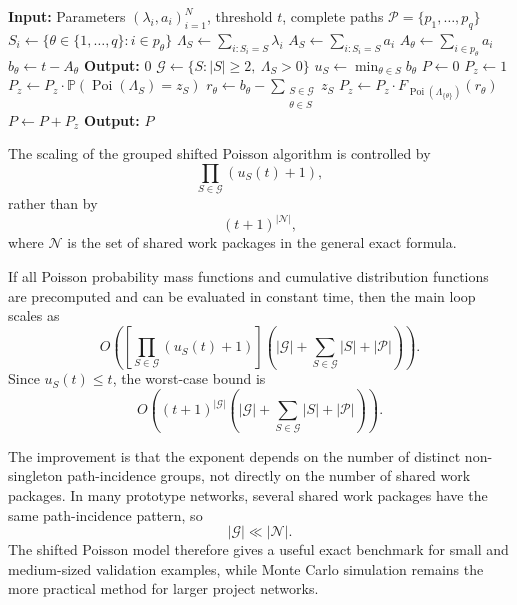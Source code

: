\documentclass[11pt,a4paper]{article}
\newcommand{\pP}{\mathbb{P}}
\newcommand{\1}{\mathbf{1}}
\theoremstyle{definition}
\theoremstyle{plain}
\theoremstyle{remark}
\numberwithin{equation}{section}
\begin{document}
\begin{algorithm}[H]
\caption{Exact calculation of $\pP(T_{\text{Project}}\leq t)$ under shifted Poisson durations}
\label{alg:cdf_T_project_shifted_poisson_grouped}
\begin{algorithmic}[1]
\State \textbf{Input:} Parameters $(\lambda_i,a_i)_{i=1}^N$, threshold $t$, complete paths $\mathcal{P}=\{p_1,\ldots,p_q\}$
    \State $S_i \leftarrow \{\theta\in\{1,\ldots,q\}: i\in p_\theta\}$
\EndFor
{}
    \State $\Lambda_S \leftarrow \sum_{i:S_i=S}\lambda_i$
    \State $A_S \leftarrow \sum_{i:S_i=S}a_i$
\EndFor
{}
    \State $A_\theta \leftarrow \sum_{i\in p_\theta}a_i$
    \State $b_\theta \leftarrow t-A_\theta$
        \State \textbf{Output:} $0$
    \EndIf
\EndFor
\State $\mathcal{G}\leftarrow\{S: |S|\geq 2,\ \Lambda_S>0\}$
    \State $u_S \leftarrow \min_{\theta\in S} b_\theta$
\EndFor
\State $P\leftarrow 0$
    \State $P_z\leftarrow 1$
        \State $P_z\leftarrow P_z\cdot \pP(\operatorname{Poi}(\Lambda_S)=z_S)$
    \EndFor
        \State $r_\theta\leftarrow b_\theta-\sum_{\substack{S\in\mathcal{G}\\ \theta\in S}}z_S$
        \State $P_z\leftarrow P_z\cdot F_{\operatorname{Poi}(\Lambda_{\{\theta\}})}(r_\theta)$
    \EndFor
    \State $P\leftarrow P+P_z$
\EndFor
\State \textbf{Output:} $P$
\end{algorithmic}
\end{algorithm}

The scaling of the grouped shifted Poisson algorithm is controlled by
\[
\prod_{S\in\mathcal{G}}(u_S(t)+1),
\]
rather than by
\[
(t+1)^{|\mathcal{N}|},
\]
where $\mathcal{N}$ is the set of shared work packages in the general exact formula.

If all Poisson probability mass functions and cumulative distribution functions are precomputed and can be evaluated in constant time, then the main loop scales as
\[
O\left(
\left[
\prod_{S\in\mathcal{G}}(u_S(t)+1)
\right]
\left(
|\mathcal{G}|+\sum_{S\in\mathcal{G}}|S|+|\mathcal{P}|
\right)
\right).
\]
Since $u_S(t)\leq t$, the worst-case bound is
\[
O\left(
(t+1)^{|\mathcal{G}|}
\left(
|\mathcal{G}|+\sum_{S\in\mathcal{G}}|S|+|\mathcal{P}|
\right)
\right).
\]

The improvement is that the exponent depends on the number of distinct non-singleton path-incidence groups, not directly on the number of shared work packages. In many prototype networks, several shared work packages have the same path-incidence pattern, so
\[
|\mathcal{G}|\ll |\mathcal{N}|.
\]
The shifted Poisson model therefore gives a useful exact benchmark for small and medium-sized validation examples, while Monte Carlo simulation remains the more practical method for larger project networks.
\end{document}
